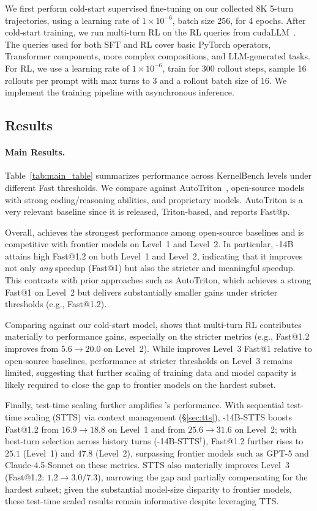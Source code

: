 We first perform cold-start supervised fine-tuning on our collected 8K 5-turn trajectories, using a learning rate of $1\times 10^{-6}$, batch size 256, for 4 epochs. After cold-start training, we run multi-turn RL on the RL queries from cudaLLM~\citep{cudallm2025}. The queries used for both SFT and RL cover basic PyTorch operators, Transformer components, more complex compositions, and LLM-generated tasks. For RL, we use a learning rate of $1\times 10^{-6}$, train for 300 rollout steps, sample 16 rollouts per prompt with max turns to 3 and a rollout batch size of 16. We implement the training pipeline with asynchronous inference.

\subsection{Results}
\paragraph{Main Results.}
Table~\ref{tab:main_table} summarizes performance across KernelBench levels under different Fast thresholds. We compare  against AutoTriton~\citep{li2025autotriton}, open-source models with strong coding/reasoning abilities, and proprietary models. AutoTriton is a very relevant baseline since it is released, Triton-based, and reports Fast@p.

Overall,  achieves the strongest performance among open-source baselines and is competitive with frontier models on Level~1 and Level~2. In particular, -14B attains high Fast@1.2 on both Level~1 and Level~2, indicating that it improves not only \emph{any} speedup (Fast@1) but also the stricter and meaningful speedup. This contrasts with prior approaches such as AutoTriton, which achieves a strong Fast@1 on Level~2 but delivers substantially smaller gains under stricter thresholds (e.g., Fast@1.2).

Comparing against our cold-start model,  shows that multi-turn RL contributes materially to performance gains, especially on the stricter metrics (e.g., Fast@1.2 improves from \(5.6 \rightarrow 20.0\) on Level~2). While  improves Level~3 Fast@1 relative to open-source baselines, performance at stricter thresholds on Level~3 remains limited, suggesting that further scaling of training data and model capacity is likely required to close the gap to frontier models on the hardest subset.

Finally, test-time scaling further amplifies 's performance. With sequential test-time scaling (STTS) via context management (\S\ref{sec:tts}), -14B-STTS boosts Fast@1.2 from $16.9\rightarrow18.8$ on Level~1 and from $25.6\rightarrow31.6$ on Level~2; with best-turn selection across history turns (-14B-STTS$^\dagger$), Fast@1.2 further rises to $25.1$ (Level~1) and $47.8$ (Level~2), surpassing frontier models such as GPT-5 and Claude-4.5-Sonnet on these metrics. STTS also materially improves Level~3 (Fast@1.2: $1.2\rightarrow3.0/7.3$), narrowing the gap and partially compensating for the hardest subset; given the substantial model-size disparity to frontier models, these test-time scaled results remain informative despite leveraging TTS.

